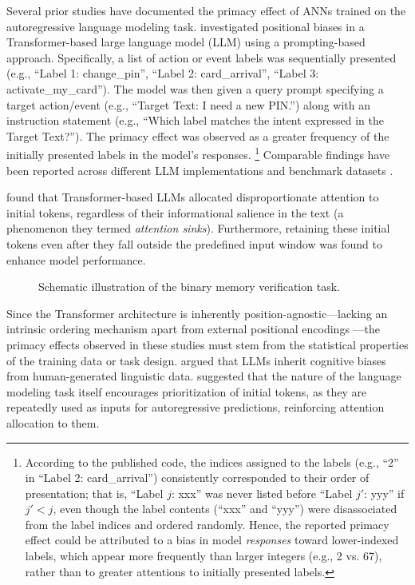 \documentclass[10pt,letterpaper]{article}
\begin{document}
Several prior studies have documented the primacy effect of ANNs trained on the autoregressive language modeling task.
\citet{Wang+23_primacy-effect} investigated positional biases in a Transformer-based large language model (LLM) using a prompting-based approach.
Specifically, a list of action or event labels was sequentially presented (e.g., ``Label 1: change\_pin'', ``Label 2: card\_arrival'', ``Label 3: activate\_my\_card'').
The model was then given a query prompt specifying a target action/event (e.g., ``Target Text: I need a new PIN.'') along with an instruction statement (e.g., ``Which label matches the intent expressed in the Target Text?'').
The primacy effect was observed as a greater frequency of the initially presented labels in the model's responses.%
\footnote{
	According to the published code, the indices assigned to the labels (e.g., ``2'' in ``Label 2: card\_arrival'') consistently corresponded to their order of presentation; that is, ``Label $j$: xxx'' was never listed before ``Label $j'$: yyy'' if $j'<j$, even though the label contents (``xxx'' and ``yyy'') were disassociated from the label indices and ordered randomly.
	Hence, the reported primacy effect could be attributed to a bias in model \emph{responses} toward lower-indexed labels, which appear more frequently than larger integers (e.g., 2 vs. 67), rather than to greater attentions to initially presented labels.
}
Comparable findings have been reported across different LLM implementations and benchmark datasets \citep{EicherIrgolic24,GuoVosoughi24,Janik24,Liu+24}.


\citet{Xiao+24} found that Transformer-based LLMs allocated disproportionate attention to initial tokens, regardless of their informational salience in the text (a phenomenon they termed \emph{attention sinks}).
Furthermore, retaining these initial tokens even after they fall outside the predefined input window was found to enhance model performance.

\begin{figure*}
	\centering
	
	\caption{Schematic illustration of the binary memory verification task.}
	\label{fig:task}
\end{figure*}

Since the Transformer architecture is inherently position-agnostic---lacking an intrinsic ordering mechanism apart from external positional encodings \citep{Vaswani+17_AttentionIsAllYouNeed}---the primacy effects observed in these studies must stem from the statistical properties of the training data or task design.
\citeauthor{Wang+23_primacy-effect} argued that LLMs inherit cognitive biases from human-generated linguistic data.
\citeauthor{Xiao+24} suggested that the nature of the language modeling task itself encourages prioritization of initial tokens, as they are repeatedly used as inputs for autoregressive predictions, reinforcing attention allocation to them.
\end{document}
